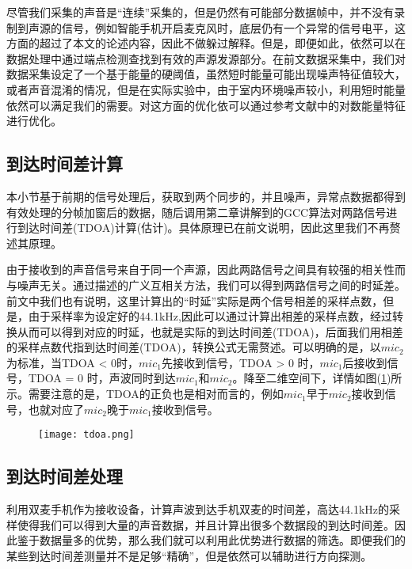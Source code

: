 \documentclass[winfonts,oneside]{njuthesis}
\begin{document}
			尽管我们采集的声音是“连续”采集的，但是仍然有可能部分数据帧中，并不没有录制到声源的信号，例如智能手机开启麦克风时，底层仍有一个异常的信号电平，这方面的超过了本文的论述内容，因此不做躲过解释。但是，即便如此，依然可以在数据处理中通过端点检测查找到有效的声源发源部分。在前文数据采集中，我们对数据采集设定了一个基于能量的硬阈值，虽然短时能量可能出现噪声特征值较大，或者声音混淆的情况，但是在实际实验中，由于室内环境噪声较小，利用短时能量依然可以满足我们的需要。对这方面的优化依可以通过参考文献\cite{Endpoint_detection}中的对数能量特征进行优化。
		
		\subsection{到达时间差计算}
			
			本小节基于前期的信号处理后，获取到两个同步的，并且噪声，异常点数据都得到有效处理的分帧加窗后的数据，随后调用第二章讲解到的GCC算法对两路信号进行到达时间差(TDOA)计算(估计)。具体原理已在前文说明，因此这里我们不再赘述其原理。
			
			由于接收到的声音信号来自于同一个声源，因此两路信号之间具有较强的相关性而与噪声无关。通过描述的广义互相关方法，我们可以得到两路信号之间的时延差。前文中我们也有说明，这里计算出的“时延”实际是两个信号相差的采样点数，但是，由于采样率为设定好的44.1kHz,因此可以通过计算出相差的采样点数，经过转换从而可以得到对应的时延，也就是实际的到达时间差(TDOA)，后面我们用相差的采样点数代指到达时间差(TDOA)，转换公式无需赘述。可以明确的是，以$mic_2$为标准，当TDOA < 0时，$mic_1$先接收到信号，TDOA > 0 时，$mic_1$后接收到信号，TDOA = 0 时，声波同时到达$mic_1$和$mic_2$。降至二维空间下，详情如图(\ref{fig: tdoa})所示。需要注意的是，TDOA的正负也是相对而言的，例如$mic_1$早于$mic_2$接收到信号，也就对应了$mic_2$晚于$mic_1$接收到信号。
			
			\begin{figure}[H]
				\centering
				\texttt{[image: tdoa.png]} 
				\caption{{}}
				\label{fig: tdoa}
			\end{figure}
		
		\subsection{到达时间差处理}
		
		利用双麦手机作为接收设备，计算声波到达手机双麦的时间差，高达44.1kHz的采样使得我们可以得到大量的声音数据，并且计算出很多个数据段的到达时间差。因此鉴于数据量多的优势，那么我们就可以利用此优势进行数据的筛选。即便我们的某些到达时间差测量并不是足够“精确”，但是依然可以辅助进行方向探测。
		
\end{document}
